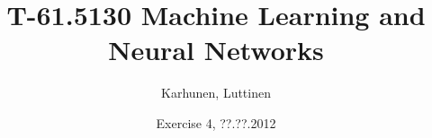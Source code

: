 \title{T-61.5130 Machine Learning and Neural Networks}
\author{Karhunen, Luttinen}
\date{Exercise 4, ??.??.2012}


\newcommand{\vect}[1]{{\bf{#1}}}
\newcommand{\svect}[1]{\boldsymbol{#1}}
\newcommand{\matr}[1]{\boldsymbol{#1}}




\maketitle

